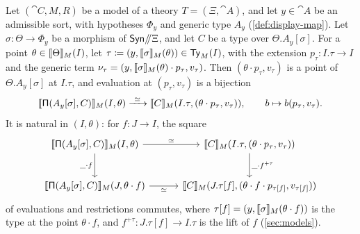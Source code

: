 \begin{proposition}\label{prop:binding-model}
    Let $(\cat{C}, M, R)$ be a model of a theory $T = (\Xi, \cat{A})$, and let $y \in \cat{A}$ be an admissible sort, with hypotheses $\Phi_y$ and generic type $A_y$ (\cref{def:display-map}). Let $\sigma : \Theta \to \Phi_y$ be a morphism of $\mathsf{Syn}\mathord{/\mkern-5mu/}\Xi$, and let $C$ be a type over $\Theta.A_y[\sigma]$. For a point $\theta \in \llbracket\Theta\rrbracket_M(I)$, let ${\tau \coloneqq (y, \llbracket\sigma\rrbracket_M(\theta)) \in \mathsf{Ty}_M(I)}$, with the extension $p_\tau : I.\tau \to I$ and the generic term ${\nu_\tau = (y, \llbracket\sigma\rrbracket_M(\theta) \cdot p_\tau, v_\tau)}$. Then $(\theta \cdot p_\tau, v_\tau)$ is a point of $\Theta.A_y[\sigma]$ at $I.\tau$, and evaluation at $(p_\tau, v_\tau)$ is a bijection
    \[
        \llbracket\mathsf{\Pi}(A_y[\sigma], C)\rrbracket_M(I, \theta) \xrightarrow{\ \simeq\ } \llbracket C\rrbracket_M(I.\tau, (\theta \cdot p_\tau, v_\tau)), \qquad b \mapsto b(p_\tau, v_\tau).
    \]
    It is natural in $(I, \theta)$: for $f : J \to I$, the square
    \[\begin{tikzcd}[column sep=3em, row sep=2.5em]
        {\sem{\PiT(A_y[\sigma], C)}_M(I, \theta)} & {\sem{C}_M(I.\tau, (\theta \cdot p_\tau, v_\tau))} \\
        {\sem{\PiT(A_y[\sigma], C)}_M(J, \theta \cdot f)} & {\sem{C}_M(J.\tau[f], (\theta \cdot f \cdot p_{\tau[f]}, v_{\tau[f]}))}
        \arrow["\simeq", from=1-1, to=1-2]
        \arrow["{\_ \cdot f}"', from=1-1, to=2-1]
        \arrow["{\_ \cdot f^{+\tau}}", from=1-2, to=2-2]
        \arrow["\simeq"', from=2-1, to=2-2]
    \end{tikzcd}\]
    of evaluations and restrictions commutes, where $\tau[f] = (y, \llbracket\sigma\rrbracket_M(\theta \cdot f))$ is the type at the point $\theta \cdot f$, and $f^{+\tau} : J.\tau[f] \to I.\tau$ is the lift of $f$ (\cref{sec:models}).
\end{proposition}

